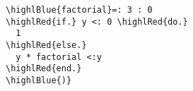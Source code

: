 \documentclass[a4paper,11pt]{article}
\newcommand\highlRed[1]{\textcolor[rgb]{1,0,0}{\textbf{#1}}}
\newcommand\highlBlue[1]{\textcolor[rgb]{0,0,1}{\textbf{#1}}}
\begin{document}
\begin{Verbatim}[commandchars=\\\{\}]
\highlBlue{factorial}=: 3 : 0
\highlRed{if.} y <: 0 \highlRed{do.}
  1
\highlRed{else.}
  y * factorial <:y
\highlRed{end.}
\highlBlue{)}


\end{Verbatim}
\end{document}
